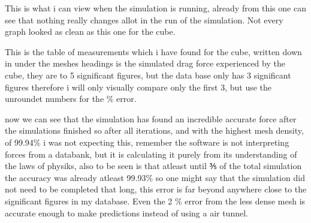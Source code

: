 \documentclass[12pt,a4paper]{article}
\begin{document}
This is what i can view when the simulation is running, already from this one can see that nothing really changes allot in the run of the simulation. Not every graph looked as clean as this one for the cube.

\begin{table}[H]
\centering
\caption{Full data collected for the cube simulation}
\end{table}

This is the table of measurements which i have found for the cube, written down in under the meshes headings is the simulated drag force experienced by the cube, they are to 5 significant figures, but the data base only has 3 significant figures therefore i will only visually compare only the first 3, but use the unroundet numbers for the \% error.

now we can see that the simulation has found an incredible accurate force after the simulations finished so after all iterations, and with the highest mesh density, of 99.94\% i was not expecting this, remember the software is not interpreting forces from a databank, but it is calculating it purely from its understanding of the laws of physiks, also to be seen is that atleast until ⅗ of the total simulation the accuracy was already atleast 99.93\% so one might say that the simulation did not need to be completed that long, this error is far beyond anywhere close to the significant figures in my database. Even the 2 \% error from the less dense mesh is accurate enough to make predictions instead of using a air tunnel. 
\end{document}
